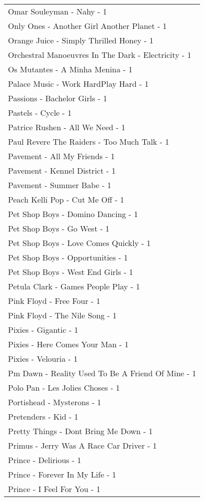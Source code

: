 \documentclass[
]{article}
\begin{document}
\begin{longtable}{l}
Omar Souleyman - Nahy - 1 \\ 
Only Ones - Another Girl Another Planet - 1 \\ 
Orange Juice - Simply Thrilled Honey - 1 \\ 
Orchestral Manoeuvres In The Dark - Electricity - 1 \\ 
Os Mutantes - A Minha Menina - 1 \\ 
Palace Music - Work HardPlay Hard - 1 \\ 
Passions - Bachelor Girls - 1 \\ 
Pastels - Cycle - 1 \\ 
Patrice Rushen - All We Need - 1 \\ 
Paul Revere The Raiders - Too Much Talk - 1 \\ 
Pavement - All My Friends - 1 \\ 
Pavement - Kennel District - 1 \\ 
Pavement - Summer Babe - 1 \\ 
Peach Kelli Pop - Cut Me Off - 1 \\ 
Pet Shop Boys - Domino Dancing - 1 \\ 
Pet Shop Boys - Go West - 1 \\ 
Pet Shop Boys - Love Comes Quickly - 1 \\ 
Pet Shop Boys - Opportunities - 1 \\ 
Pet Shop Boys - West End Girls - 1 \\ 
Petula Clark - Games People Play - 1 \\ 
Pink Floyd - Free Four - 1 \\ 
Pink Floyd - The Nile Song - 1 \\ 
Pixies - Gigantic - 1 \\ 
Pixies - Here Comes Your Man - 1 \\ 
Pixies - Velouria - 1 \\ 
Pm Dawn - Reality Used To Be A Friend Of Mine - 1 \\ 
Polo Pan - Les Jolies Choses - 1 \\ 
Portishead - Mysterons - 1 \\ 
Pretenders - Kid - 1 \\ 
Pretty Things - Dont Bring Me Down - 1 \\ 
Primus - Jerry Was A Race Car Driver - 1 \\ 
Prince - Delirious - 1 \\ 
Prince - Forever In My Life - 1 \\ 
Prince - I Feel For You - 1 \\ 

\end{longtable}
\end{document}

